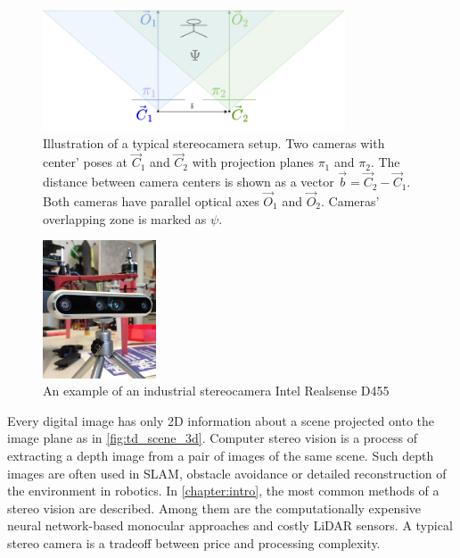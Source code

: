 \begin{figure}[ht]
    \centering
    \includegraphics[width=0.8\textwidth]{graphics/stereopair.png}
    \caption[Illustration of a typical stereocamera setup.]{Illustration of a typical stereocamera setup. Two cameras with center' poses at $\vec{C}_1$ and $\vec{C}_2$ with projection planes $\pi_1$ and $\pi_2$.
    The distance between camera centers is shown as a vector $\vec{b} = \vec{C}_2 - \vec{C}_1$. 
    Both cameras have parallel optical axes $\vec{O}_1$ and $\vec{O}_2$. 
    Cameras' overlapping zone is marked as $\psi$.}
    \label{fig:sch_stereo}
\end{figure}
\begin{figure}[ht]
    \centering
    \includegraphics[width=0.3\textwidth]{graphics/stereo_example.jpg}
    \caption[An example of an industrial stereocamera.]{An example of an industrial stereocamera Intel Realsense D455}
    \label{fig:inteld455}
\end{figure}

Every digital image has only 2D information about a scene projected onto the image plane as in \autoref{fig:td_scene_3d}.
Computer stereo vision is a process of extracting a depth image from a pair of images of the same scene. 
Such depth images are often used in SLAM, obstacle avoidance or detailed reconstruction of the environment in robotics.
In \autoref{chapter:intro}, the most common methods of a stereo vision are described.
Among them are the computationally expensive neural network-based monocular approaches and costly LiDAR sensors.
A typical stereo camera is a tradeoff between price and processing complexity.

